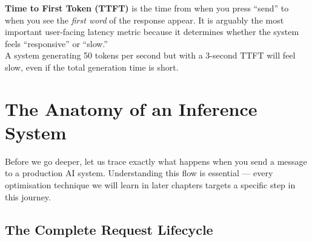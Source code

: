 \documentclass[12pt, twoside, openright]{book}
\newcommand{\term}[1]{\textbf{\color{chaptercolor}#1}}
\begin{document}
\begin{notebox}
\term{Time to First Token (TTFT)} is the time from when you press
``send'' to when you see the \textit{first word} of the response appear.
It is arguably the most important user-facing latency metric because
it determines whether the system feels ``responsive'' or ``slow.''\\[4pt]
A system generating 50 tokens per second but with a 3-second TTFT
will feel slow, even if the total generation time is short.
\end{notebox}

\section{The Anatomy of an Inference System}

Before we go deeper, let us trace exactly what happens when you send
a message to a production AI system.
Understanding this flow is essential --- every optimisation technique
we will learn in later chapters targets a specific step in this journey.

\subsection{The Complete Request Lifecycle}
\end{document}
